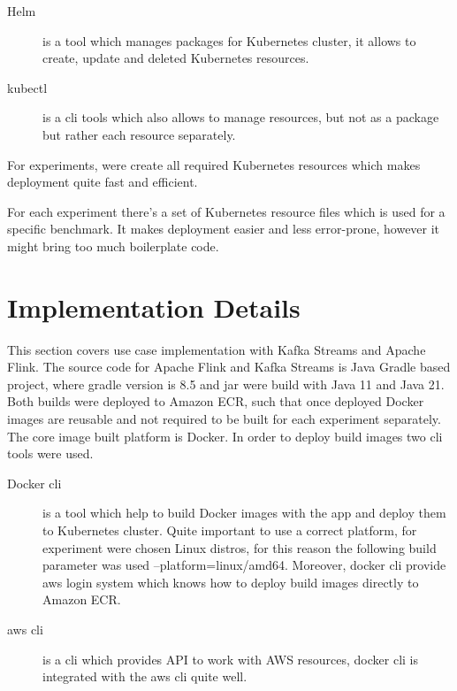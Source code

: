 \begin{description}
    \item[Helm] is a tool which manages packages for Kubernetes cluster, it allows to create,
    update and deleted Kubernetes resources.
    \item[kubectl] is a cli tools which also allows to manage resources, but not as a package but
    rather each resource separately.
\end{description}

For experiments, were create all required Kubernetes resources which makes deployment
quite fast and efficient.

For each experiment there's a set of Kubernetes resource files which is used
for a specific benchmark.
It makes deployment easier and less error-prone, however it might bring
too much boilerplate code.



\section{Implementation Details}\label{sec:implementation-details}
This section covers use case implementation with Kafka Streams and Apache Flink.
The source code for Apache Flink and Kafka Streams is Java Gradle based project,
where gradle version is 8.5 and jar were build with Java 11 and Java 21.
Both builds were deployed to Amazon ECR, such that once deployed Docker images
are reusable and not required to be built for each experiment separately.
The core image built platform is Docker.
In order to deploy build images two cli tools were used.

\begin{description}
    \item[Docker cli] is a tool which help to build Docker images with the app and deploy them
    to Kubernetes cluster.
    Quite important to use a correct platform, for experiment were chosen Linux distros, for
    this reason the following build parameter was used --platform=linux/amd64.
    Moreover, docker cli provide aws login system which knows how to deploy build images directly to
    Amazon ECR.
    \item[aws cli] is a cli which provides API to work with AWS resources, docker cli
    is integrated with the aws cli quite well.
\end{description}



